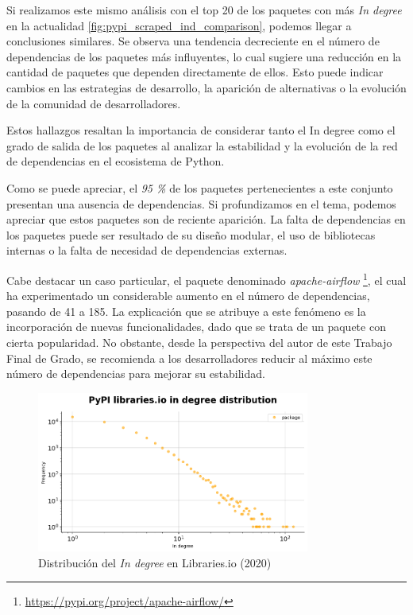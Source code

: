 Si realizamos este mismo análisis con el top 20 de los paquetes con más \textit{In degree} en la
actualidad \ref{fig:pypi_scraped_ind_comparison}, podemos llegar a
conclusiones similares. Se observa una tendencia decreciente en el número de dependencias de los paquetes
más influyentes, lo cual sugiere una reducción en la cantidad de paquetes que dependen directamente de ellos.
Esto puede indicar cambios en las estrategias de desarrollo, la aparición de alternativas o la evolución de la
comunidad de desarrolladores.

Estos hallazgos resaltan la importancia de considerar tanto el In degree como el grado de salida de
los paquetes al analizar la estabilidad y la evolución de la red de dependencias en el ecosistema de Python.

Como se puede apreciar, el \textit{95 \%} de los paquetes pertenecientes a este conjunto presentan una ausencia
de dependencias.
Si profundizamos en el tema, podemos apreciar que estos paquetes son de reciente aparición. La falta de
dependencias en los paquetes puede ser resultado de su diseño modular, el uso de
bibliotecas internas o la falta de necesidad de dependencias externas.

Cabe destacar un caso particular, el paquete denominado \textit{apache-airflow}
\footnote{\url{https://pypi.org/project/apache-airflow/}}, el cual ha experimentado un considerable aumento
en el número de dependencias, pasando de 41 a 185. La explicación que se atribuye a este fenómeno es la
incorporación de nuevas funcionalidades, dado que se trata de un paquete con cierta popularidad. No obstante,
desde la perspectiva del autor de este Trabajo Final de Grado, se recomienda a los desarrolladores reducir
al máximo este número de dependencias para mejorar su estabilidad.

\begin{figure}[ht!]
    \begin{center}
        \includegraphics[width=0.8\textwidth]{img/pypi/ind_libio_d.png}
        \caption{Distribución del \textit{In degree} en Libraries.io (2020)}
        \label{fig: Distribución del In degree en Libraries.io}
    \end{center}
\end{figure}

